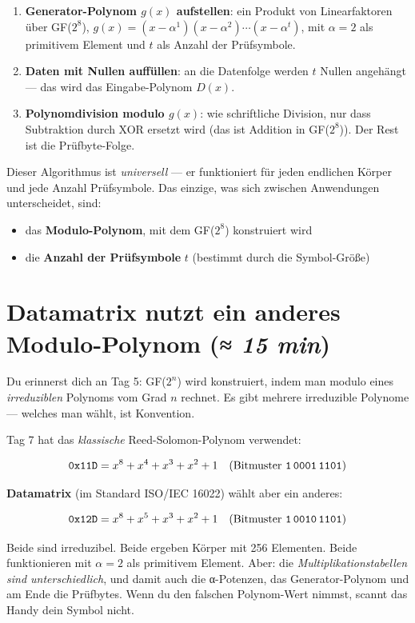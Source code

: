 \begin{enumerate}
\item \textbf{Generator-Polynom $g(x)$ aufstellen}: ein Produkt von
  Linearfaktoren über GF($2^8$),
  $g(x) = (x - \alpha^1)(x - \alpha^2) \cdots (x - \alpha^t)$,
  mit $\alpha = 2$ als primitivem Element und $t$ als Anzahl der
  Prüfsymbole.
\item \textbf{Daten mit Nullen auffüllen}: an die Datenfolge werden
  $t$ Nullen angehängt — das wird das Eingabe-Polynom $D(x)$.
\item \textbf{Polynomdivision modulo $g(x)$}: wie schriftliche
  Division, nur dass Subtraktion durch XOR ersetzt wird (das ist
  Addition in GF($2^8$)). Der Rest ist die Prüfbyte-Folge.
\end{enumerate}

Dieser Algorithmus ist \emph{universell} — er funktioniert für jeden
endlichen Körper und jede Anzahl Prüfsymbole. Das einzige, was sich
zwischen Anwendungen unterscheidet, sind:

\begin{itemize}
\item das \textbf{Modulo-Polynom}, mit dem GF($2^8$) konstruiert wird
\item die \textbf{Anzahl der Prüfsymbole} $t$ (bestimmt durch die
  Symbol-Größe)
\end{itemize}

\section{Datamatrix nutzt ein anderes Modulo-Polynom \normalfont(\textit{≈ 15 min})}

Du erinnerst dich an Tag 5: GF($2^n$) wird konstruiert, indem man
modulo eines \emph{irreduziblen} Polynoms vom Grad $n$ rechnet. Es
gibt mehrere irreduzible Polynome — welches man wählt, ist Konvention.

Tag 7 hat das \emph{klassische} Reed-Solomon-Polynom verwendet:

\[
  \texttt{0x11D} = x^8 + x^4 + x^3 + x^2 + 1
  \quad (\text{Bitmuster } \texttt{1\,0001\,1101})
\]

\textbf{Datamatrix} (im Standard ISO/IEC 16022) wählt aber ein
anderes:

\[
  \texttt{0x12D} = x^8 + x^5 + x^3 + x^2 + 1
  \quad (\text{Bitmuster } \texttt{1\,0010\,1101})
\]

Beide sind irreduzibel. Beide ergeben Körper mit 256 Elementen.
Beide funktionieren mit $\alpha = 2$ als primitivem Element. Aber:
die \emph{Multiplikationstabellen sind unterschiedlich}, und damit
auch die α-Potenzen, das Generator-Polynom und am Ende die
Prüfbytes. Wenn du den falschen Polynom-Wert nimmst, scannt das
Handy dein Symbol nicht.

